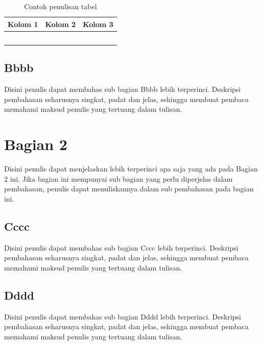 \begin{table}[h]
  \caption{Contoh penulisan tabel}
  \label{tab:contoh}
  \centering
  \begin{tabular}{|C{45.9mm}|C{18.3mm}|C{23.6mm}|}
    \hline
    \headrow \textbf{Kolom 1} & \textbf{Kolom 2} & \textbf{Kolom 3} \\
    \hline
     & & \\ \hline
     & & \\ \hline
     & & \\ \hline
     & & \\ \hline
     & & \\ \hline
  \end{tabular}
\end{table}

\subsection{Bbbb}

Disini penulis dapat membahas sub bagian Bbbb lebih terperinci. Deskripsi
pembahasan seharusnya singkat, padat dan jelas, sehingga membuat pembaca
memahami maksud penulis yang tertuang dalam tulisan.

\section{Bagian 2}

Disini penulis dapat menjelaskan lebih terperinci apa saja yang ada pada
Bagian 2 ini. Jika bagian ini mempunyai sub bagian yang perlu diperjelas dalam
pembahasan, penulis dapat menuliskannya dalam sub pembahasan pada bagian ini.

\subsection{Cccc}

Disini penulis dapat membahas sub bagian Cccc lebih terperinci. Deskripsi
pembahasan seharusnya singkat, padat dan jelas, sehingga membuat pembaca
memahami maksud penulis yang tertuang dalam tulisan.

\subsection{Dddd}

Disini penulis dapat membahas sub bagian Dddd lebih terperinci. Deskripsi
pembahasan seharusnya singkat, padat dan jelas, sehingga membuat pembaca
memahami maksud penulis yang tertuang dalam tulisan.

